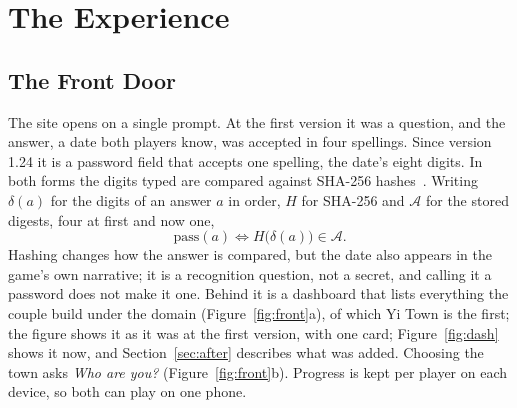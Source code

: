 \documentclass[sigconf,nonacm]{acmart}
\newcommand{\yt}{Yi Town}
\begin{document}
\section{The Experience}\label{sec:experience}

\subsection{The Front Door}
The site opens on a single prompt. At the first version it was a question, and the answer, a
date both players know, was accepted in four spellings. Since version 1.24 it is a password
field that accepts one spelling, the date's eight digits. In both forms the digits typed are
compared against SHA-256 hashes~\cite{fips1804}. Writing
$\delta(a)$ for the digits of an answer $a$ in order, $H$ for SHA-256 and $\mathcal{A}$ for the
stored digests, four at first and now one,
\begin{equation}\label{eq:gate}
  \mathrm{pass}(a) \iff H\big(\delta(a)\big) \in \mathcal{A} .
\end{equation}
Hashing changes how the answer is compared, but the date also appears in the game's own narrative;
it is a recognition question, not a secret, and calling it a password does not make it one. Behind it is a dashboard that lists everything the couple
build under the domain (Figure~\ref{fig:front}a), of which \yt{} is the first; the figure shows
it as it was at the first version, with one card; Figure~\ref{fig:dash} shows it now, and
Section~\ref{sec:after} describes what was added. Choosing the town
asks \emph{Who are you?} (Figure~\ref{fig:front}b). Progress is kept per player on each device,
so both can play on one phone.
\end{document}
